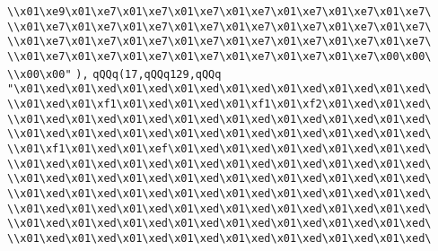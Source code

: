 \verb|\\x01\xe9\x01\xe7\x01\xe7\x01\xe7\x01\xe7\x01\xe7\x01\xe7\x01\xe7\|\newline
\verb|\\x01\xe7\x01\xe7\x01\xe7\x01\xe7\x01\xe7\x01\xe7\x01\xe7\x01\xe7\|\newline
\verb|\\x01\xe7\x01\xe7\x01\xe7\x01\xe7\x01\xe7\x01\xe7\x01\xe7\x01\xe7\|\newline
\verb|\\x01\xe7\x01\xe7\x01\xe7\x01\xe7\x01\xe7\x01\xe7\x01\xe7\x00\x00\|\newline
\verb|\\x00\x00"|\newline
\verb|),|\newline
\verb|qQQq(17,qQQq129,qQQq|\newline
\verb|"\x01\xed\x01\xed\x01\xed\x01\xed\x01\xed\x01\xed\x01\xed\x01\xed\|\newline
\verb|\\x01\xed\x01\xf1\x01\xed\x01\xed\x01\xf1\x01\xf2\x01\xed\x01\xed\|\newline
\verb|\\x01\xed\x01\xed\x01\xed\x01\xed\x01\xed\x01\xed\x01\xed\x01\xed\|\newline
\verb|\\x01\xed\x01\xed\x01\xed\x01\xed\x01\xed\x01\xed\x01\xed\x01\xed\|\newline
\verb|\\x01\xf1\x01\xed\x01\xef\x01\xed\x01\xed\x01\xed\x01\xed\x01\xed\|\newline
\verb|\\x01\xed\x01\xed\x01\xed\x01\xed\x01\xed\x01\xed\x01\xed\x01\xed\|\newline
\verb|\\x01\xed\x01\xed\x01\xed\x01\xed\x01\xed\x01\xed\x01\xed\x01\xed\|\newline
\verb|\\x01\xed\x01\xed\x01\xed\x01\xed\x01\xed\x01\xed\x01\xed\x01\xed\|\newline
\verb|\\x01\xed\x01\xed\x01\xed\x01\xed\x01\xed\x01\xed\x01\xed\x01\xed\|\newline
\verb|\\x01\xed\x01\xed\x01\xed\x01\xed\x01\xed\x01\xed\x01\xed\x01\xed\|\newline
\verb|\\x01\xed\x01\xed\x01\xed\x01\xed\x01\xed\x01\xed\x01\xed\x01\xed\|\newline
